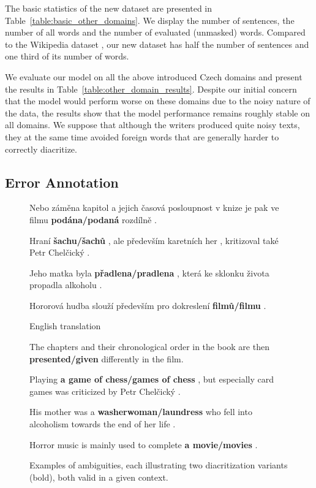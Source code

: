 \documentclass{pbmlarxiv}
\newenvironment{framedexample}{\begin{center}\begin{minipage}[c]{1\hsize}\setlength{\FrameSep}{5pt}\begin{framed}\setlength{\parskip}{4pt}}{\end{framed}\end{minipage}\end{center}}
\newcommand{\englishexamples}[1]{\begin{center}\small English translation #1\end{center}}
\begin{document}
The basic statistics of the new dataset are presented in Table~\ref{table:basic_other_domains}. We display the number of sentences, the number of all words and the number of evaluated (unmasked) words. Compared to the Wikipedia dataset \cite{naplava2018diacritics}, our new dataset has half the number of sentences and one third of its number of words.

We evaluate our model on all the above introduced Czech domains and present the results in Table~\ref{table:other_domain_results}. Despite our initial concern that the model would perform worse on these domains due to the noisy nature of the data, the results show that the model performance remains roughly stable on all domains. We suppose that although the writers produced quite noisy texts, they at the same time avoided foreign words that are generally harder to correctly diacritize.

\subsection{Error Annotation}
\label{sec:plausible_variants}

\begin{figure}[t]
    \begin{framedexample}
        Nebo záměna kapitol a jejich časová posloupnost v knize je pak ve filmu \textbf{podána/podaná} rozdílně .
        
        Hraní \textbf{šachu/šachů} , ale především karetních her , kritizoval také Petr Chelčický . 
        
        Jeho matka byla \textbf{přadlena/pradlena} , která ke sklonku života propadla alkoholu .
        
        Hororová hudba slouží především pro dokreslení \textbf{filmů/filmu} .
    \end{framedexample}
        
    \itshape
    \begin{framedexample}
        \englishexamples{}
        The chapters and their chronological order in the book are then \textbf{presented/given} differently in the film.
        
        Playing \textbf{a game of chess/games of chess} , but especially card games was criticized by Petr Chelčický . 
        
        His mother was a \textbf{washerwoman/laundress} who fell into alcoholism towards the end of her life .
        
        Horror music is mainly used to complete \textbf{a movie/movies} .
    \end{framedexample}        

    \caption{Examples of ambiguities, each illustrating two diacritization variants (bold), both valid in a given context.}
    \label{table:ambiguties_examples}
\end{figure}
\end{document}
